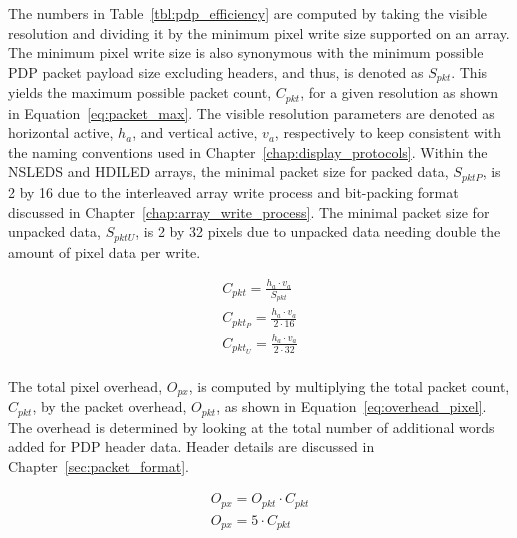     The numbers in Table~\ref{tbl:pdp_efficiency} are computed by taking the visible resolution and dividing it by the minimum pixel write size supported on an array. The minimum pixel write size is also synonymous with the minimum possible PDP packet payload size excluding headers, and thus, is denoted as $S_{pkt}$. This yields the maximum possible packet count, $C_{pkt}$, for a given resolution as shown in Equation~\eqref{eq:packet_max}. The visible resolution parameters are denoted as horizontal active, $h_a$, and vertical active, $v_a$, respectively to keep consistent with the naming conventions used in Chapter~\ref{chap:display_protocols}. Within the NSLEDS and HDILED arrays, the minimal packet size for packed data, $S_{pktP}$, is 2 by 16 due to the interleaved array write process and bit-packing format discussed in Chapter~\ref{chap:array_write_process}. The minimal packet size for unpacked data, $S_{pktU}$, is 2 by 32 pixels due to unpacked data needing double the amount of pixel data per write.

    \begin{equation}
        \begin{array}{ l }
            \displaystyle C_{pkt}=\frac{h_a \cdot v_a}{S_{pkt}} \\[13pt]
            \displaystyle C_{pkt_P}=\frac{h_a \cdot v_a}{2 \cdot 16}\\[13pt]
            \displaystyle C_{pkt_U}=\frac{h_a \cdot v_a}{2 \cdot 32}\\[13pt]
        \end{array}
        \label{eq:packet_max}
    \end{equation}

    The total pixel overhead, $O_{px}$, is computed by multiplying the total packet count, $C_{pkt}$, by the packet overhead, $O_{pkt}$, as shown in Equation~\eqref{eq:overhead_pixel}. The overhead is determined by looking at the total number of additional words added for PDP header data. Header details are discussed in Chapter~\ref{sec:packet_format}.

    \begin{equation}
        \begin{array}{ l }
            \displaystyle O_{px}=O_{pkt} \cdot C_{pkt} \\
            \displaystyle O_{px}=5\cdot C_{pkt} \\[13pt]
        \end{array}
        \label{eq:overhead_pixel}
    \end{equation}

